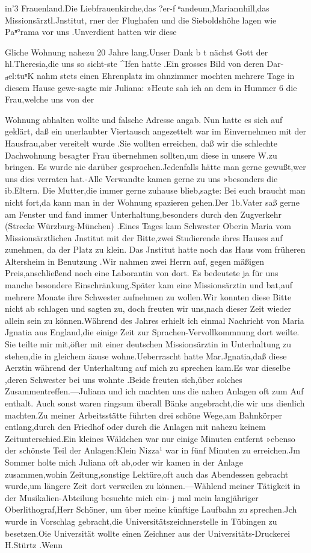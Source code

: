 \documentclass[a4paper,11pt]{article}
\begin{document}
in'3 Frauenland.Die Liebfrauenkirche,das ?er-f ⁿandeum,Mariannhill,das Missionsärztl.Jnstitut, rner der Flughafen und die Sieboldshöhe lagen wie Paⁿ°rama vor uns .Unverdient hatten wir diese

  Gliche Wohnung nahezu 20 Jahre lang.Unser Dank b t nächst Gott der hl.Theresia,die uns so sicht-ste ^Ifen hatte .Ein grosses Bild von deren Dar-ₑᵢel:tuⁿK nahm stets einen Ehrenplatz im ohnzimmer mochten mehrere Tage in diesem Hause gewe-sagte mir Juliana: »Heute sah ich an dem in Hummer 6 die Frau,welche uns von der

Wohnung abhalten wollte und falsche Adresse angab. Nun hatte es sich auf geklärt, daß ein unerlaubter Viertausch angezettelt war im Einvernehmen mit der Hausfrau,aber vereitelt wurde .Sie wollten erreichen, daß wir die schlechte Dachwohnung besagter Frau übernehmen sollten,um diese in unsere W.zu bringen. Es wurde nie darüber gesprochen.Jedenfalls hätte man gerne gewußt,wer uns dies verraten hat.-Alle Verwandte kamen gerne zu uns »besonders die ib.Eltern. Die Mutter,die immer gerne zuhause blieb,sagte: Bei euch braucht man nicht fort,da kann man in der Wohnung spazieren gehen.Der 1b.Vater saß gerne am Fenster und fand immer Unterhaltung,besonders durch den Zugverkehr (Strecke Würzburg-München) .Eines Tages kam Schwester Oberin Maria vom Missionsärztlichen Jnstitut mit der Bitte,zwei Studierende ihres Hauses auf zunehmen, da der Platz zu klein. Das Jnstitut hatte noch das Haus vom früheren Altersheim in Benutzung .Wir nahmen zwei Herrn auf, gegen mäßigen Preis,anschließend noch eine Laborantin von dort. Es bedeutete ja für uns manche besondere Einschränkung.Später kam eine Missionsärztin und bat,auf mehrere Monate ihre Schwester aufnehmen zu wollen.Wir konnten diese Bitte nicht ab schlagen und sagten zu, doch freuten wir uns,nach dieser Zeit wieder allein sein zu können.Während des Jahres erhielt ich einmal Nachricht von Maria Jgnatia aus England,die einige Zeit zur Sprachen-Vervollkommnung dort weilte. Sie teilte mir mit,öfter mit einer deutschen Missionsärztin in Unterhaltung zu stehen,die in gleichem äause wohne.Ueberrascht hatte Mar.Jgnatia,daß diese Aerztin während der Unterhaltung auf mich zu sprechen kam.Es war dieselbe ,deren Schwester bei uns wohnte .Beide freuten sich,über solches Zusammentreffen.—Juliana und ich machten uns die nahen Anlagen oft zum Auf enthalt. Auch sonst waren ringsum überall Bänke angebracht,die wir uns dienlich machten.Zu meiner Arbeitsstätte führten drei schöne Wege,am Bahnkörper entlang,durch den Friedhof oder durch die Anlagen mit nahezu keinem Zeitunterschied.Ein kleines Wäldchen war nur einige Minuten entfernt »ebenso der schönste Teil der Anlagen:Klein Nizza¹ war in fünf Minuten zu erreichen.Jm Sommer holte mich Juliana oft ab,oder wir kamen in der Anlage zusammen,wohin Zeitung,sonstige Lektüre,oft auch das Abendessen gebracht wurde,um längere Zeit dort verweilen zu können.—Wählend meiner Tätigkeit in der Musikalien-Abteilung besuchte mich ein- j mal mein langjähriger Oberlithograf,Herr Schöner, um über meine künftige Laufbahn zu sprechen.Jch wurde in Vorschlag gebracht,die Universitätszeichnerstelle in Tübingen zu besetzen.Oie Universität wollte einen Zeichner aus der Universitäts-Druckerei H.Stürtz .Wenn 
\end{document}
